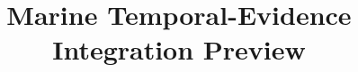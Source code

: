 \documentclass[conference]{IEEEtran}
\begin{document}
\title{Marine Temporal-Evidence Integration Preview}
\maketitle



\end{document}
